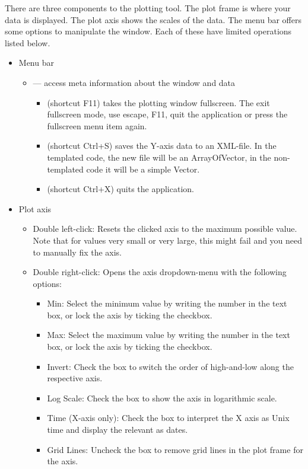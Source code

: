 There are three components to the plotting tool.  The plot frame is where your data
is displayed.  The plot axis shows the scales of the data.  The menu bar offers
some options to manipulate the window.  Each of these have limited operations listed below.
\begin{itemize}
 \item Menu bar
  \begin{itemize}
   \item {} --- access meta information about the window and data
    \begin{itemize}
     \item {} (shortcut F11) takes the plotting window fullscreen.  The exit fullscreen mode, use escape, F11, quit the application or press the fullscreen menu item again.
     \item {} (shortcut Ctrl+S) saves the Y-axis data to an XML-file.  In the templated code, the new file will be an ArrayOfVector, in the non-templated code it will be a simple Vector.
     \item {} (shortcut Ctrl+X) quits the application.
    \end{itemize}
  \end{itemize}
 \item Plot axis
  \begin{itemize}
   \item Double left-click: Resets the clicked axis to the maximum possible value.  Note that for values very small or very large, this might fail and you need to manually fix the axis.
   \item Double right-click: Opens the axis dropdown-menu with the following options:
    \begin{itemize}
     \item Min: Select the minimum value by writing the number in the text box, or lock the axis by ticking the checkbox.
     \item Max: Select the maximum value by writing the number in the text box, or lock the axis by ticking the checkbox.
     \item Invert: Check the box to switch the order of high-and-low along the respective axis.
     \item Log Scale: Check the box to show the axis in logarithmic scale.
     \item Time (X-axis only): Check the box to interpret the X axis as Unix time and display the relevant as dates.
     \item Grid Lines: Uncheck the box to remove grid lines in the plot frame for the axis.

\end{itemize}
\end{itemize}
\end{itemize}
